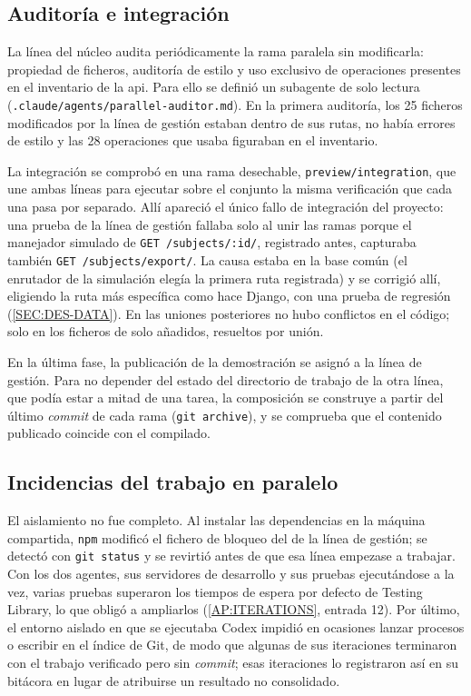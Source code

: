 \subsection{Auditoría e integración}

La línea del núcleo audita periódicamente la rama paralela sin modificarla: propiedad de
ficheros, auditoría de estilo y uso exclusivo de operaciones presentes en el inventario de
la \acs{api}. Para ello se definió un subagente de solo lectura
(\texttt{.claude/agents/parallel-auditor.md}). En la primera auditoría, los 25 ficheros
modificados por la línea de gestión estaban dentro de sus rutas, no había errores de estilo
y las 28 operaciones que usaba figuraban en el inventario.

La integración se comprobó en una rama desechable, \texttt{preview/integration}, que une
ambas líneas para ejecutar sobre el conjunto la misma verificación que cada una pasa por
separado. Allí apareció el único fallo de integración del proyecto: una prueba de la línea
de gestión fallaba solo al unir las ramas porque el manejador simulado de
\texttt{GET /subjects/:id/}, registrado antes, capturaba también \texttt{GET
/subjects/export/}. La causa estaba en la base común (el enrutador de la simulación elegía
la primera ruta registrada) y se corrigió allí, eligiendo la ruta más específica como hace
Django, con una prueba de regresión (\cref{SEC:DES-DATA}). En las uniones posteriores no
hubo conflictos en el código; solo en los ficheros de solo añadidos, resueltos por unión.

En la última fase, la publicación de la demostración se asignó a la línea de gestión. Para
no depender del estado del directorio de trabajo de la otra línea, que podía estar a mitad
de una tarea, la composición se construye a partir del último \textit{commit} de cada rama
(\texttt{git archive}), y se comprueba que el contenido publicado coincide con el compilado.

\subsection{Incidencias del trabajo en paralelo}

El aislamiento no fue completo. Al instalar las dependencias en la máquina compartida,
\texttt{npm} modificó el fichero de bloqueo del  de la línea de gestión; se
detectó con \texttt{git status} y se revirtió antes de que esa línea empezase a trabajar.
Con los dos agentes, sus servidores de desarrollo y sus pruebas ejecutándose a la vez, varias
pruebas superaron los tiempos de espera por defecto de Testing Library, lo que obligó a
ampliarlos (\cref{AP:ITERATIONS}, entrada 12). Por último, el entorno aislado en que se
ejecutaba Codex impidió en ocasiones lanzar procesos o escribir en el índice de Git, de modo
que algunas de sus iteraciones terminaron con el trabajo verificado pero sin
\textit{commit}; esas iteraciones lo registraron así en su bitácora en lugar de atribuirse
un resultado no consolidado.

